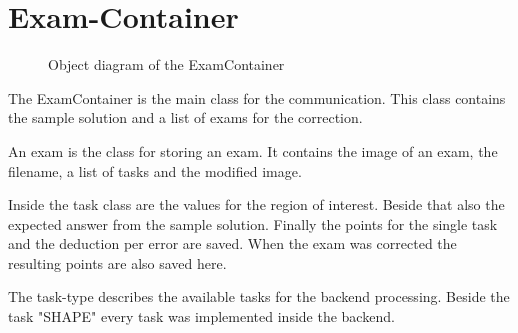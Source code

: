 \author{Florian Müller and Paul Hoffmann}
\chapter{Exam-Container}

\begin{figure}[H]
    \centering
    \caption{Object diagram of the ExamContainer}
\end{figure}

The ExamContainer is the main class for the communication.
This class contains the sample solution and a list of exams for the correction.

An exam is the class for storing an exam.
It contains the image of an exam, the filename, a list of tasks and the modified image.

Inside the task class are the values for the region of interest.
Beside that also the expected answer from the sample solution.
Finally the points for the single task and the deduction per error are saved.
When the exam was corrected the resulting points are also saved here.

The task-type describes the available tasks for the backend processing.
Beside the task "SHAPE" every task was implemented inside the backend.
